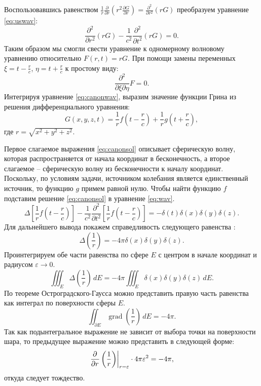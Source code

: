 \documentclass[a4paper, fontsize=14pt]{article}
\newcommand{\gradop}{\operatorname{grad}}
\begin{document}
	Воспользовавшись равенством $\frac{1}{r}\frac{\partial}{\partial r}\left(r^2\frac{\partial G}{\partial r}\right) = \frac{\partial^2}{\partial r^2}\left(rG\right)$ преобразуем уравнение \eqref{eq:uswav}:
	\begin{equation}
		\frac{\partial^2}{\partial r^2}\left( r  G\right)- \frac{1}{c^2} \frac{\partial^2 }{\partial
			t^2}\left(r G\right) = 0.
		\label{eq:uswav2}
	\end{equation}
	Таким образом мы смогли свести уравнение к одномерному волновому уравнению относительно $F(r,t) = rG$. При помощи замены переменных $\xi = t - \frac{r}{c}$, $\eta = t+\frac{r}{c}$ к простому виду:
	\begin{equation}
		\frac{\partial^2}{\partial \xi \partial \eta} F = 0.
		\label{eq:canonwav}
	\end{equation}
	Интегрируя уравнение \eqref{eq:canonwav}, выразим значение функции Грина из решения дифференциального уравнения:
	\begin{equation}
		G(x,y,z,t) = \frac{1}{r}f\left(t-\frac{r}{c}\right) + \frac{1}{r} g\left(t+\frac{r}{c}\right),
		\label{eq:canonsol}
	\end{equation}
где $r = \sqrt{x^2+y^2+z^2}$.

Первое слагаемое выражения \eqref{eq:canonsol} описывает сферическую волну, которая распространяется от начала координат в бесконечность, а второе слагаемое -- сферическую волну из бесконечности к началу координат. Поскольку, по условиям задачи, источником колебания является единственный источник, то функцию $g$ примем равной нулю.  Чтобы найти функцию  $f$  подставим решение \eqref{eq:canonsol} в уравнение \eqref{eq:wav}. 
\begin{equation}
	\Delta \left[ \frac{1}{r}f\left(t-\frac{r}{c}\right) \right] - \frac{1}{c^2} \frac{\partial^2 }{\partial
		t^2}\left[ \frac{1}{r}f\left(t-\frac{r}{c}\right) \right]  = - \delta(t)\delta(x)\delta(y)\delta(z).
		\label{eq:fwav}
\end{equation}
Для дальнейшего вывода покажем справедливость следующего равенства \cite{morse}:
	\begin{equation}
		\Delta\left(\frac{1}{r}\right) = -4\pi \delta(x)\delta(y)\delta(z).
		\label{eq:del1r}
	\end{equation}
Проинтегрируем обе части равенства по сфере $E$ с центром в начале координат и радиусом $\varepsilon \to 0$.
\begin{equation}
	\iiint_E \Delta\left(\frac{1}{r}\right) \, dE = -4\pi \iiint_E \delta(x)\delta(y)\delta(z) \, dE.
\end{equation}
По теореме Остроградского-Гаусса можно представить правую часть равенства как интеграл по поверхности сферы $E$.
\begin{equation}
	\iint_{\partial E} \gradop \left(\frac{1}{r}\right) \, dE = -4\pi.
\end{equation}
Так как подынтегральное выражение не зависит от выбора точки на поверхности шара, то предыдущее выражение можно представить в следующей форме:
\begin{equation}
	 \left.\frac{\partial ^ {  } {}}{\partial {r} ^ {  } }\left(\frac{1}{r}\right)\right|_{r=\varepsilon} \cdot 4\pi \varepsilon^2 = -4\pi,
\end{equation}	
откуда следует тождество.
\end{document}
